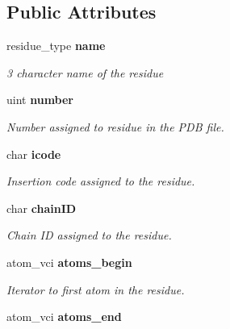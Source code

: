 \subsection*{Public Attributes}
\begin{CompactItemize}
\item 
residue\_\-type \bf{name}\label{classSimSite3D_1_1residue__t_d33ebf59abe10245839a2e3e976f28b6}

\begin{CompactList}\small\item\em 3 character name of the residue \item\end{CompactList}\item 
uint \bf{number}\label{classSimSite3D_1_1residue__t_f22f101c1c4287d1f7217e8a4a3ef882}

\begin{CompactList}\small\item\em Number assigned to residue in the PDB file. \item\end{CompactList}\item 
char \bf{icode}\label{classSimSite3D_1_1residue__t_9ba317e5ba32fc025f3405bce5bcfc3d}

\begin{CompactList}\small\item\em Insertion code assigned to the residue. \item\end{CompactList}\item 
char \bf{chain\-ID}\label{classSimSite3D_1_1residue__t_a22d41efc884bf49196aedf45456668d}

\begin{CompactList}\small\item\em Chain ID assigned to the residue. \item\end{CompactList}\item 
atom\_\-vci \bf{atoms\_\-begin}\label{classSimSite3D_1_1residue__t_a0aecc888b54e490610196493aae54c9}

\begin{CompactList}\small\item\em Iterator to first atom in the residue. \item\end{CompactList}\item 
atom\_\-vci \bf{atoms\_\-end}\label{classSimSite3D_1_1residue__t_9315cf7728dc09465af606000f04bcf7}


\end{CompactItemize}
